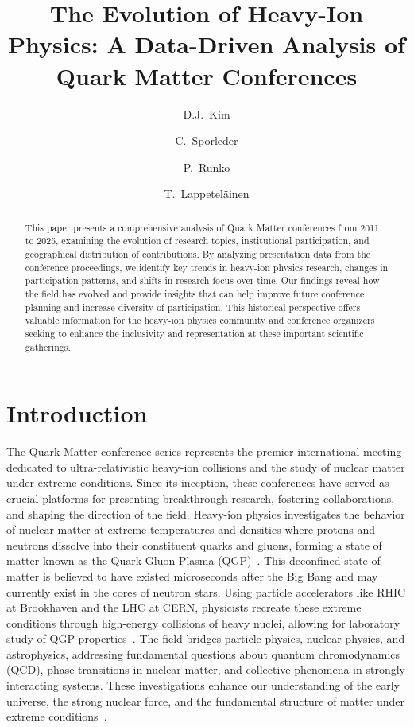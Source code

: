 \documentclass[a4paper,11pt]{article}
\title{The Evolution of Heavy-Ion Physics: A Data-Driven Analysis of Quark Matter Conferences}
\author[1]{D.J.~Kim}
\author[1]{C.~Sporleder}
\author[1]{P.~Runko}
\author[1]{T.~Lappeteläinen}
\affil[1]{Department of Physics, University of jyväskylä, Finland}
\begin{document}
\maketitle

\begin{abstract}
This paper presents a comprehensive analysis of Quark Matter conferences from 2011 to 2025, examining the evolution of research topics, institutional participation, and geographical distribution of contributions. By analyzing presentation data from the conference proceedings, we identify key trends in heavy-ion physics research, changes in participation patterns, and shifts in research focus over time. Our findings reveal how the field has evolved and provide insights that can help improve future conference planning and increase diversity of participation. This historical perspective offers valuable information for the heavy-ion physics community and conference organizers seeking to enhance the inclusivity and representation at these important scientific gatherings.
\end{abstract}

\section{Introduction}

The Quark Matter conference series represents the premier international meeting dedicated to ultra-relativistic heavy-ion collisions and the study of nuclear matter under extreme conditions. Since its inception, these conferences have served as crucial platforms for presenting breakthrough research, fostering collaborations, and shaping the direction of the field. 
Heavy-ion physics investigates the behavior of nuclear matter at extreme temperatures and densities where protons and neutrons dissolve into their constituent quarks and gluons, forming a state of matter known as the Quark-Gluon Plasma (QGP)~\cite{Shuryak:2008eq, Kovtun:2004de}. This deconfined state of matter is believed to have existed microseconds after the Big Bang and may currently exist in the cores of neutron stars. Using particle accelerators like RHIC at Brookhaven and the LHC at CERN, physicists recreate these extreme conditions through high-energy collisions of heavy nuclei, allowing for laboratory study of QGP properties~\cite{Adams:2005dq, Adcox:2004mh, Arsene:2004fa, Back:2004je, ALICE:2022wpn}. The field bridges particle physics, nuclear physics, and astrophysics, addressing fundamental questions about quantum chromodynamics (QCD), phase transitions in nuclear matter, and collective phenomena in strongly interacting systems. These investigations enhance our understanding of the early universe, the strong nuclear force, and the fundamental structure of matter under extreme conditions~\cite{Akiba:2015jwa}.
\end{document}
